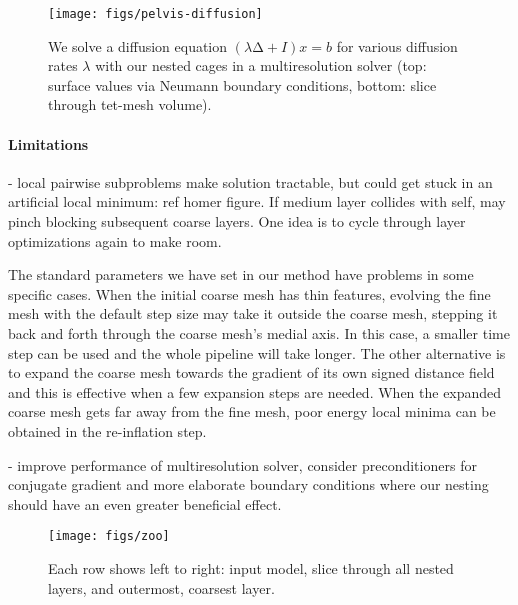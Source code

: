 \begin{figure}
  \texttt{[image: figs/pelvis-diffusion]}
  \caption{We solve a diffusion equation $(λ∆+I) x = b$ for various diffusion
  rates $λ$ with our nested cages in a multiresolution solver (top: surface
  values via Neumann boundary conditions, bottom: slice through tet-mesh
  volume).}
  \label{fig:pelvis-diffusion}
\end{figure}


\paragraph{Limitations}
%

- local pairwise subproblems make solution tractable, but could get stuck in an
  artificial local minimum: ref homer figure. If medium layer collides with
  self, may pinch blocking subsequent coarse layers. One idea is to cycle
  through layer optimizations again to make room.

The standard parameters we have set in our method have problems in some specific
cases. When the initial coarse mesh has thin features, evolving the fine mesh
with the default step size may take it outside the coarse mesh, stepping it back
and forth through the coarse mesh's medial axis. In this case,
a smaller time step can be used and the whole pipeline will take longer.
The other alternative is to expand the coarse mesh towards the gradient
of its own signed distance field and this is effective when a few expansion steps
are needed. When the expanded coarse mesh gets far away from the fine mesh,
poor energy local minima can be obtained in the re-inflation step.

- improve performance of multiresolution solver, consider preconditioners for
  conjugate gradient and more elaborate boundary conditions where our nesting
  should have an even greater beneficial effect.

\begin{figure*}
  \texttt{[image: figs/zoo]}
  \caption{Each row shows left to right: input model, slice through all nested
  layers, and outermost, coarsest layer.}
  \label{fig:zoo}
\end{figure*}
